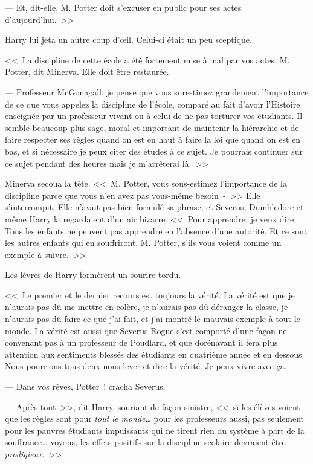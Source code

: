 --- Et, dit-elle, M. Potter doit s'excuser en public pour ses actes d'aujourd'hui.~>>

Harry lui jeta un autre coup d'œil. Celui-ci était un peu sceptique.

<<~La discipline de cette école a été fortement mise à mal par vos actes, M. Potter, dit Minerva. Elle doit être restaurée.

--- Professeur McGonagall, je pense que vous surestimez grandement l'importance de ce que vous appelez la discipline de l'école, comparé au fait d'avoir l'Histoire enseignée par un professeur vivant ou à celui de ne pas torturer vos étudiants. Il semble beaucoup plus sage, moral et important de maintenir la hiérarchie et de faire respecter ses règles quand on est en haut à faire la loi que quand on est en bas, et si nécessaire je peux citer des études à ce sujet. Je pourrais continuer sur ce sujet pendant des heures mais je m'arrêterai là.~>>

Minerva secoua la tête. <<~M. Potter, vous sous-estimez l'importance de la discipline parce que vous n'en avez pas vous-même besoin~-~>> Elle s'interrompit. Elle n'avait pas bien formulé sa phrase, et Severus, Dumbledore et même Harry la regardaient d'un air bizarre. <<~Pour apprendre, je veux dire. Tous les enfants ne peuvent pas apprendre en l'absence d'une autorité. Et ce sont les autres enfants qui en souffriront, M. Potter, s'ils vous voient comme un exemple à suivre.~>>

Les lèvres de Harry formèrent un sourire tordu.

<<~Le premier et le dernier recours est toujours la vérité. La vérité est que je n'aurais pas dû me mettre en colère, je n'aurais pas dû déranger la classe, je n'aurais pas dû faire ce que j'ai fait, et j'ai montré le mauvais exemple à tout le monde. La vérité est aussi que Severus Rogue s'est comporté d'une façon ne convenant pas à un professeur de Poudlard, et que dorénavant il fera plus attention aux sentiments blessés des étudiants en quatrième année et en dessous. Nous pourrions tous deux nous lever et dire la vérité. Je peux vivre avec ça.

--- Dans vos rêves, Potter~! cracha Severus.

--- Après tout~>>, dit Harry, souriant de façon sinistre, <<~si les élèves voient que les règles sont pour \emph{tout le monde}… pour les professeurs aussi, pas seulement pour les pauvres étudiants impuissants qui ne tirent rien du système à part de la souffrance… voyons, les effets positifs sur la discipline scolaire devraient être \emph{prodigieux}.~>>

